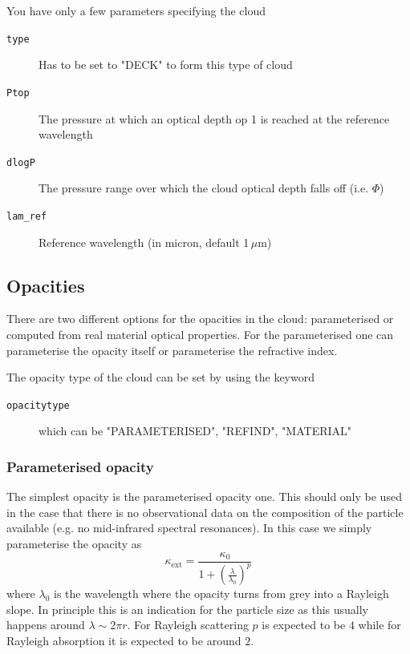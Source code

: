 \documentclass[12pt]{article}
\begin{document}
You have only a few parameters specifying the cloud

\begin{description}
\item[\texttt{type}]
Has to be set to "DECK" to form this type of cloud
\item[\texttt{Ptop}]
The pressure at which an optical depth op 1 is reached at the reference wavelength
\item[\texttt{dlogP}]
The pressure range over which the cloud optical depth falls off (i.e. $\Phi$)
\item[\texttt{lam\_ref}]
Reference wavelength (in micron, default 1\,$\mu$m)
\end{description}

\subsection{Opacities}

There are two different options for the opacities in the cloud: parameterised or computed from real material optical properties. For the parameterised one can parameterise the opacity itself or parameterise the refractive index.

The opacity type of the cloud can be set by using the keyword
\begin{description}
\item[\texttt{opacitytype}]
which can be "PARAMETERISED", "REFIND", "MATERIAL"
\end{description}

\subsubsection{Parameterised opacity}

The simplest opacity is the parameterised opacity one. This should only be used in the case that there is no observational data on the composition of the particle available (e.g. no mid-infrared spectral resonances). In this case we simply parameterise the opacity as
\begin{equation}
\label{eq:paropac}
\kappa_\mathrm{ext}=\frac{\kappa_0}{1+\left(\frac{\lambda}{\lambda_0}\right)^{p}}
\end{equation}
where $\lambda_0$ is the wavelength where the opacity turns from grey into a Rayleigh slope. In principle this is an indication for the particle size as this usually happens around $\lambda\sim2\pi r$. For Rayleigh scattering $p$ is expected to be $4$ while for Rayleigh absorption it is expected to be around $2$.
\end{document}
